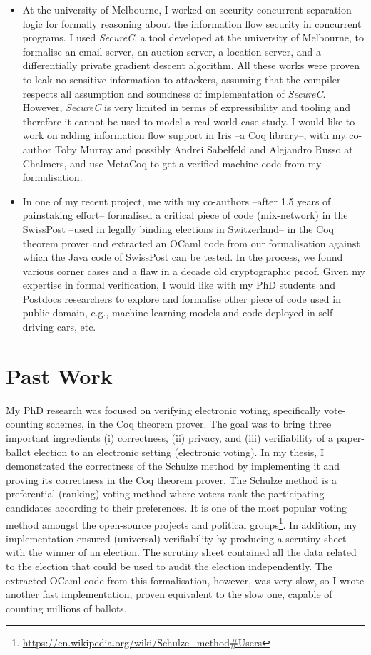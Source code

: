 \documentclass[a4paper]{article}
\begin{document}
\begin{itemize}
\item At the university of Melbourne, I worked on 
security concurrent separation logic for formally reasoning about the information 
flow security in concurrent programs. I used \textit{SecureC}, a tool developed at the university of 
Melbourne, to formalise an email server, an auction server, a location server, and 
a differentially private gradient descent algorithm. 
All these works were proven to leak no sensitive 
information to attackers, assuming that the compiler respects all 
assumption and soundness of implementation of \textit{SecureC}. However, 
\textit{SecureC} is very limited in terms of expressibility and tooling 
and therefore it cannot be used to model a real world case study. I would like to work on 
adding information flow support in Iris --a Coq library--, with my co-author Toby Murray and 
possibly Andrei Sabelfeld and Alejandro Russo at Chalmers, and use MetaCoq to get a verified 
machine code from my formalisation. 


\item In one of my recent project, me with my co-authors --after 1.5 years of 
painstaking effort-- formalised a critical 
piece of code (mix-network) in the SwissPost --used in legally binding elections 
in Switzerland-- in the Coq theorem prover and extracted an OCaml code from our 
formalisation against which the Java code of SwissPost can be tested. 
In the process, we found various 
corner cases and a flaw in a decade old cryptographic proof.  Given my 
expertise in formal verification, I would like with my PhD students and 
Postdocs researchers to explore and formalise other 
piece of code used in public domain, e.g., machine learning 
models and code deployed in self-driving cars, etc. 


\end{itemize}	

\section{Past Work}
My PhD research was focused on verifying electronic voting, specifically vote-counting schemes, in 
the Coq theorem prover. The goal was to 
bring  three important ingredients (i) correctness, (ii) privacy, and (iii) verifiability of a 
paper-ballot election to 
an electronic setting (electronic voting).
In my thesis, I demonstrated the correctness of the Schulze method 
by implementing it and proving its correctness in the Coq theorem 
prover. The Schulze method is a preferential (ranking) voting method where voters rank the participating 
candidates according to their preferences. It is one of the most popular voting method amongst the open-source projects and 
political groups\footnote{\url{https://en.wikipedia.org/wiki/Schulze_method#Users}}.
In addition, my implementation 
ensured (universal) verifiability by producing a scrutiny sheet 
with the winner of an election. The scrutiny sheet contained all the data related 
to the election that could be used to audit the election independently. 
The extracted OCaml code from this formalisation, however, was 
very slow, so I wrote another fast implementation, proven equivalent to the slow one,
capable of counting millions of ballots.
\end{document}
